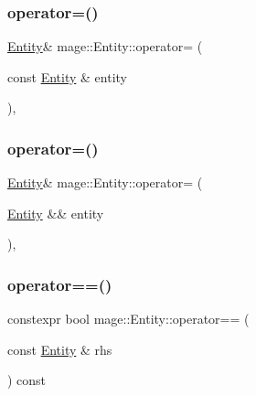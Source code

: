 \mbox{\label{classmage_1_1_entity_abaf86e29f4fef924f4aa704db1a67482}} 
\subsubsection{\texorpdfstring{operator=()}{operator=()}\hspace{0.1cm}{\footnotesize\ttfamily [1/2]}}
{\footnotesize\ttfamily \mbox{\hyperlink{classmage_1_1_entity}{Entity}}\& mage\+::\+Entity\+::operator= (\begin{DoxyParamCaption}\item[{const \mbox{\hyperlink{classmage_1_1_entity}{Entity}} \&}]{entity }\end{DoxyParamCaption})\hspace{0.3cm}{\ttfamily [default]}, {\ttfamily [noexcept]}}

\mbox{\label{classmage_1_1_entity_ab9348933892f8134186b9adc1431ba43}} 
\subsubsection{\texorpdfstring{operator=()}{operator=()}\hspace{0.1cm}{\footnotesize\ttfamily [2/2]}}
{\footnotesize\ttfamily \mbox{\hyperlink{classmage_1_1_entity}{Entity}}\& mage\+::\+Entity\+::operator= (\begin{DoxyParamCaption}\item[{\mbox{\hyperlink{classmage_1_1_entity}{Entity}} \&\&}]{entity }\end{DoxyParamCaption})\hspace{0.3cm}{\ttfamily [default]}, {\ttfamily [noexcept]}}

\mbox{\label{classmage_1_1_entity_a432270050f461ed19d5f82ab2dba2333}} 
\subsubsection{\texorpdfstring{operator==()}{operator==()}}
{\footnotesize\ttfamily constexpr bool mage\+::\+Entity\+::operator== (\begin{DoxyParamCaption}\item[{const \mbox{\hyperlink{classmage_1_1_entity}{Entity}} \&}]{rhs }\end{DoxyParamCaption}) const\hspace{0.3cm}{\ttfamily [noexcept]}}

